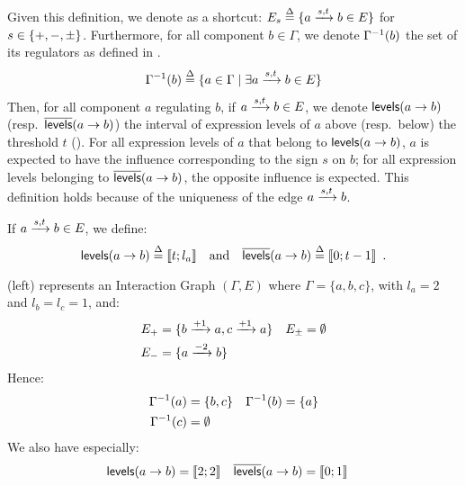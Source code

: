 
Given this definition, we denote as a shortcut:
$E_s \stackrel{\Delta}= \{ a \xrightarrow{s, t} b \in E \}$ for $s \in \{ +, -, \pm \}$.
Furthermore, for all component $b \in \Gamma$, we denote $\Gamma^{-1}(b)$ the set of its regulators as defined in .
\begin{align}
\label{eq:grn-regulators}
  \Gamma^{-1}(b) \stackrel{\Delta}= \{ a\in\Gamma\mid \exists a \xrightarrow{s, t} b \in E \}
\end{align}
Then, for all component $a$ regulating $b$,
\ie if $a \xrightarrow{s, t} b \in E$,
we denote $\mathsf{levels}(a\rightarrow b)$ (resp.~$\overline{\mathsf{levels}}(a\rightarrow b)$) the interval of expression levels of $a$ above (resp.~below) the threshold $t$ ().
For all expression levels of $a$ that belong to $\mathsf{levels}(a\rightarrow b)$, $a$ is expected to have the influence corresponding to the sign $s$ on $b$;
for all expression levels belonging to $\overline{\mathsf{levels}}(a\rightarrow b)$, the opposite influence is expected.
This definition holds because of the uniqueness of the edge $a \xrightarrow{s, t} b$.

\begin{definition}\label{def:levels}
If $a \xrightarrow{s, t} b \in E$, we define:
$$\mathsf{levels}(a\rightarrow b) \stackrel{\Delta}= \llbracket t ; l_a \rrbracket \quad \text{and} \quad \overline{\mathsf{levels}}(a\rightarrow b) \stackrel{\Delta}= \llbracket 0 ; t-1 \rrbracket \enspace.$$
\end{definition}

\begin{example}
(left) represents an Interaction Graph $(\Gamma,E)$ where
$\Gamma = \{a, b, c\}$, with $l_a = 2$ and $l_b = l_c = 1$,
and:
\begin{align*}
  E_+ &= \{b \xrightarrow{+ 1} a, c \xrightarrow{+ 1} a\} &
  E_\pm &= \emptyset \\
  E_- &= \{a \xrightarrow{- 2} b\}
\end{align*}
Hence:
\begin{align*}
  \Gamma^{-1}(a) &= \{ b, c \} &
  \Gamma^{-1}(b) &= \{ a \} \\
  \Gamma^{-1}(c) &= \emptyset
\end{align*}
We also have especially:
\begin{align*}
  \mathsf{levels}(a\rightarrow b) &= \llbracket 2 ; 2 \rrbracket & \overline{\mathsf{levels}}(a\rightarrow b) &= \llbracket 0 ; 1 \rrbracket
\end{align*}
\end{example}

